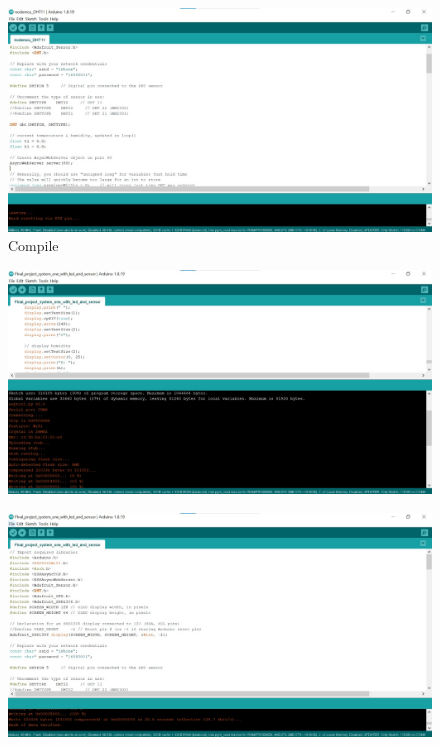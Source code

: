 \documentclass[12pt,a4paper,twocolumn,fleqn]{article}
\begin{document}
\begin{figure} [H]
\includegraphics[width=15cm]{media/out (1).jpeg}
\centering
\caption{Compile}
\end{figure}
\begin{figure} [H]
\includegraphics[width=15cm]{media/out (2).jpeg}
\centering
\end{figure}
\begin{figure} [H]
\includegraphics[width=15cm]{media/out (3).jpeg}
\centering
\end{figure}
\end{document}
